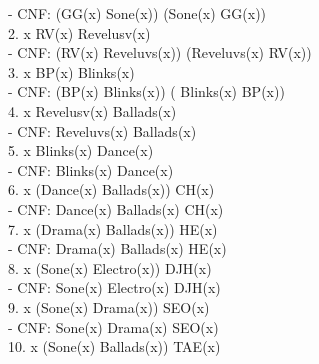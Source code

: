 \documentclass{article}
\begin{document}
\: \: \: \: - CNF: (\neg GG(x) \vee Sone(x)) \wedge (\neg Sone(x) \vee GG(x))\\

2. \forall x \: RV(x) \Leftrightarrow Revelusv(x)\\

\: \: \: \: - CNF: (\neg RV(x) \vee Reveluvs(x)) \wedge (\neg Reveluvs(x) \vee RV(x))\\

3. \forall x \: BP(x) \Leftrightarrow Blinks(x)\\

\: \: \: \: - CNF: (\neg BP(x) \vee Blinks(x)) \wedge ( \neg Blinks(x) \vee BP(x))\\

4. \forall x \: Revelusv(x) \Rightarrow Ballads(x)\\

\: \: \: \: - CNF: \neg Reveluvs(x) \wedge Ballads(x)\\

5. \forall x \: Blinks(x) \Rightarrow Dance(x)\\

\: \: \: \: - CNF: \neg Blinks(x) \vee Dance(x)\\

6. \forall x \: (Dance(x) \wedge Ballads(x)) \Rightarrow CH(x)\\

\: \: \: \: - CNF: \neg Dance(x) \vee \neg Ballads(x) \vee CH(x)\\

7. \forall x \: (Drama(x) \wedge Ballads(x)) \Rightarrow HE(x)\\

\: \: \: \: - CNF: \neg Drama(x) \vee \neg Ballads(x) \vee HE(x)\\

8. \forall x \: (Sone(x) \wedge Electro(x)) \Rightarrow DJH(x)\\

\: \: \: \: - CNF: \neg Sone(x) \vee \neg Electro(x) \vee DJH(x)\\

9. \forall x \: (Sone(x) \wedge Drama(x)) \Rightarrow SEO(x)\\

\: \: \: \: - CNF: \neg Sone(x) \vee \neg Drama(x) \vee SEO(x)\\

10. \forall x \: (Sone(x) \wedge Ballads(x)) \Rightarrow TAE(x)\\
\end{document}
